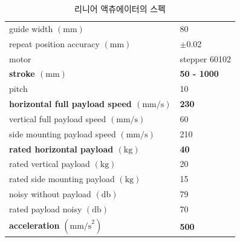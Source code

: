 \begin{table}[H]
    \centering
    \captionsetup{justification=centering}
    \caption{리니어 액츄에이터의 스펙}
    \begin{tabular}{l|l}
        \hline
        guide width $(\mathrm{mm})$                       & 80                                     \\
        repeat position accuracy $(\mathrm{mm})$          & $\pm$0.02                                 \\
        motor                                  & stepper 60102                          \\
        \textbf{stroke $(\mathrm{mm})$}                  & \textbf{50 - 1000}                                    \\
        pitch                                  & 10                                     \\
        \textbf{horizontal full payload speed $(\mathrm{mm/s})$}   & \textbf{230}                                    \\
        vertical full payload speed $(\mathrm{mm/s})$     & 60                                     \\
        side mounting payload speed $(\mathrm{mm/s})$     & 210                                    \\
        \textbf{rated horizontal payload $(\mathrm{kg})$}          & \textbf{40}                                     \\
        rated vertical payload $(\mathrm{kg})$            & 20                                     \\
        rated side mounting payload $(\mathrm{kg})$       & 15                                     \\
        noisy without payload $(\mathrm{db})$             & 79                                     \\
        rated payload noisy $(\mathrm{db})$               & 70                                     \\
        \textbf{acceleration } $(\mathrm{mm/s}^{2})$   & \textbf{500}                                    \\ \hline
    \end{tabular}%
    \label{Specification of Linear Actuator}
\end{table}


